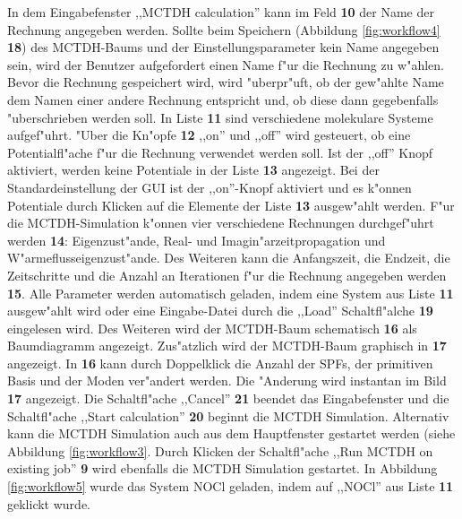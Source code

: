 In dem Eingabefenster ,,MCTDH calculation'' kann im Feld \textbf{10} der Name der Rechnung angegeben werden. 
Sollte beim Speichern (Abbildung \ref{fig:workflow4} \textbf{18}) des MCTDH-Baums und der Einstellungsparameter 
kein Name angegeben sein, wird der Benutzer 
aufgefordert einen Name f"ur die Rechnung zu w"ahlen. Bevor die Rechnung gespeichert wird, 
wird "uberpr"uft, ob der gew"ahlte Name dem Namen einer andere Rechnung entspricht und, ob diese 
dann gegebenfalls "uberschrieben werden soll.
In Liste \textbf{11} sind verschiedene molekulare Systeme aufgef"uhrt.
"Uber die Kn"opfe \textbf{12} ,,on'' und ,,off''  wird gesteuert, ob eine Potentialfl"ache f"ur die Rechnung verwendet
werden soll. Ist der ,,off'' Knopf aktiviert, werden keine Potentiale in der Liste \textbf{13} angezeigt.
Bei der Standardeinstellung der GUI ist der ,,on''-Knopf aktiviert und es k"onnen Potentiale durch Klicken
auf die Elemente der Liste \textbf{13} ausgew"ahlt werden.
F"ur die MCTDH-Simulation k"onnen vier verschiedene Rechnungen durchgef"uhrt werden \textbf{14}:
Eigenzust"ande, Real- und Imagin"arzeitpropagation und W"armeflusseigenzust"ande.
Des Weiteren kann die Anfangszeit, die Endzeit, die Zeitschritte und die Anzahl an Iterationen f"ur die 
Rechnung angegeben werden \textbf{15}. Alle Parameter werden automatisch geladen, indem eine System aus
Liste \textbf{11} ausgew"ahlt wird oder eine Eingabe-Datei durch 
die ,,Load'' Schaltfl"alche \textbf{19} eingelesen wird. 
Des Weiteren wird der MCTDH-Baum schematisch \textbf{16} als Baumdiagramm angezeigt. 
Zus"atzlich wird der MCTDH-Baum graphisch in \textbf{17} angezeigt. In \textbf{16}
kann durch Doppelklick die Anzahl der SPFs, der primitiven Basis und der Moden ver"andert werden.
Die "Anderung wird instantan im Bild \textbf{17} angezeigt.
Die Schaltfl"ache ,,Cancel'' \textbf{21} beendet das Eingabefenster
und die Schaltfl"ache ,,Start calculation'' \textbf{20} beginnt die MCTDH Simulation.
Alternativ kann die MCTDH Simulation auch aus dem Hauptfenster gestartet werden (siehe Abbildung \ref{fig:workflow3}.
Durch Klicken der Schaltfl"ache ,,Run MCTDH on existing job'' \textbf{9} wird ebenfalls
die MCTDH Simulation gestartet.
In Abbildung \ref{fig:workflow5} wurde das System NOCl geladen, indem auf ,,NOCl'' aus Liste \textbf{11} geklickt wurde.


